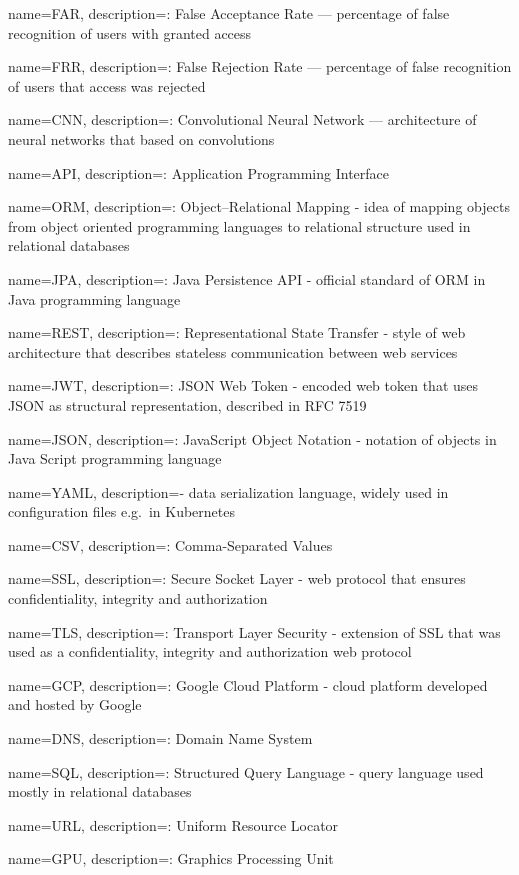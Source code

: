 \makeglossaries

{
name=FAR,
description={: False Acceptance Rate --- percentage of false recognition of users with granted access}
}

{
name=FRR,
description={: False Rejection Rate --- percentage of false recognition of users that access was rejected}
}

{
name=CNN,
description={: Convolutional Neural Network --- architecture of neural networks that based on convolutions}
}

{
name=API,
description={: Application Programming Interface}
}

{
name=ORM,
description={: Object–Relational Mapping - idea of mapping objects from object oriented programming languages to relational structure used in relational databases}
}

{
name=JPA,
description={: Java Persistence API - official standard of ORM in Java programming language}
}

{
name=REST,
description={: Representational State Transfer - style of web architecture that describes stateless communication between web services}
}

{
name=JWT,
description={: JSON Web Token - encoded web token that uses JSON as structural representation, described in RFC 7519}
}

{
name=JSON,
description={: JavaScript Object Notation - notation of objects in Java Script programming language}
}

{
name=YAML,
description={- data serialization language, widely used in configuration files e.g.\ in Kubernetes}
}

{
name=CSV,
description={: Comma-Separated Values}
}

{
name=SSL,
description={: Secure Socket Layer - web protocol that ensures confidentiality, integrity and authorization}
}

{
name=TLS,
description={: Transport Layer Security - extension of SSL that was used as a confidentiality, integrity and authorization web protocol}
}

{
name=GCP,
description={: Google Cloud Platform - cloud platform developed and hosted by Google}
}

{
name=DNS,
description={: Domain Name System}
}

{
name=SQL,
description={: Structured Query Language - query language used mostly in relational databases}
}

{
name=URL,
description={: Uniform Resource Locator}
}

{
name=GPU,
description={: Graphics Processing Unit}
}

